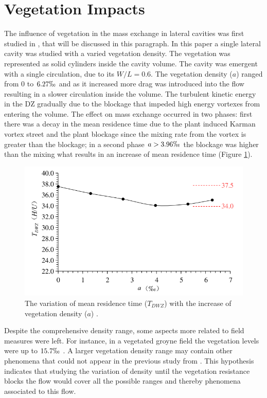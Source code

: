 \documentclass[../main.tex]{subfiles}
\begin{document}
\section{Vegetation Impacts}
The influence of vegetation in the mass exchange in lateral cavities was first studied in \textcite{xiang2019}, that will be discussed in this paragraph. In this paper a single lateral cavity was studied with a varied vegetation density. The vegetation was represented as solid cylinders inside the cavity volume. The cavity was emergent with a single circulation, due to its $W/L=0.6$. The vegetation density ($a$) ranged from 0 to $6.27\permil$ and as it increased more drag was introduced into the flow resulting in a slower circulation inside the volume. The turbulent kinetic energy in the DZ gradually due to the blockage that impeded high energy vortexes from entering the volume. The effect on mass exchange occurred in two phases: first there was a decay in the mean residence time due to the plant induced Karman vortex street and the plant blockage since the mixing rate from the vortex is greater than the blockage; in a second phase $a>3.96\permil$ the blockage was higher than the mixing what results in an increase of mean residence time (Figure \ref{fig:xiang2019fig12}).
\begin{figure}[!ht]
\centering
\includegraphics[width=0.8\linewidth]{../images/introduction/xiang2019fig12.png}
\caption{The variation of mean residence time ($T_{DWZ}$) with the increase of vegetation density ($a$) \cite{xiang2019}.}
\label{fig:xiang2019fig12}
\end{figure}

Despite the comprehensive density range, some aspects more related to field measures were left. For instance, in a vegetated groyne field the vegetation levels were up to $15.7\permil$ \cite{sukhodolov2017}. A larger vegetation density range may contain other phenomena that could not appear in the previous study from \textcite{xiang2019}. This hypothesis indicates that studying the variation of density until the vegetation resistance blocks the flow would cover all the possible ranges and thereby phenomena associated to this flow.
\end{document}
